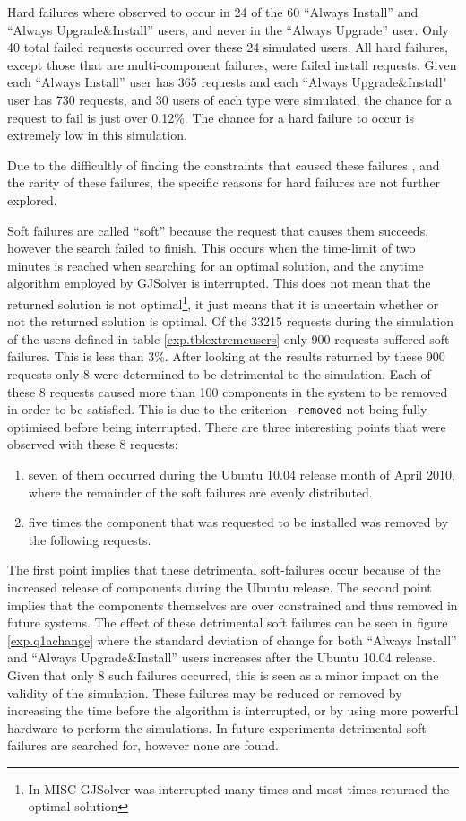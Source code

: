 Hard failures where observed to occur in 24 of the 60 ``Always Install'' and ``Always Upgrade\&Install'' users, and never in the ``Always Upgrade'' user.
Only 40 total failed requests occurred over these 24 simulated users.
All hard failures, except those that are multi-component failures, were failed install requests.
Given each ``Always Install'' user has 365 requests and each ``Always Upgrade\&Install" user has 730 requests, 
and 30 users of each type were simulated, the chance for a request to fail is just over 0.12\%.
The chance for a hard failure to occur is extremely low in this simulation.

Due to the difficultly of finding the constraints that caused these failures \citep{Junker2001},
and the rarity of these failures, the specific reasons for hard failures are not further explored.

Soft failures are called ``soft'' because the request that causes them succeeds, however the search failed to finish.
This occurs when the time-limit of two minutes is reached when searching for an optimal solution, and the anytime algorithm employed by GJSolver is interrupted.
This does not mean that the returned solution is not optimal\footnote{In MISC GJSolver was interrupted many times and most times returned the optimal solution},
it just means that it is uncertain whether or not the returned solution is optimal.
Of the 33215 requests during the simulation of the users defined in table \ref{exp.tblextremeusers} only 900 requests suffered soft failures.
This is less than 3\%.
After looking at the results returned by these 900 requests only 8 were determined to be detrimental to the simulation.
Each of these 8 requests caused more than 100 components in the system to be removed in order to be satisfied.
This is due to the criterion \texttt{-removed} not being fully optimised before being interrupted.
There are three interesting points that were observed with these 8 requests:
\begin{enumerate}
  \item seven of them occurred during the Ubuntu 10.04 release month of April 2010, where the remainder of the soft failures are evenly distributed.
  \item five times the component that was requested to be installed was removed by the following requests.
\end{enumerate}
The first point implies that these detrimental soft-failures occur because of the increased release of components during the Ubuntu release.
The second point implies that the components themselves are over constrained and thus removed in future systems.
The effect of these detrimental soft failures can be seen in figure \ref{exp.q1achange} 
where the standard deviation of change for both ``Always Install'' and ``Always Upgrade\&Install'' users increases after the Ubuntu 10.04 release.
Given that only 8 such failures occurred, this is seen as a minor impact on the validity of the simulation.
These failures may be reduced or removed by increasing the time before the algorithm is interrupted, or by using more powerful hardware to perform the simulations.
In future experiments detrimental soft failures are searched for, however none are found.

